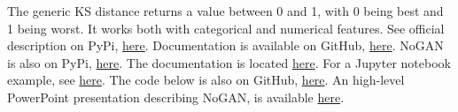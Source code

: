 \documentclass[oneside,10pt]{book}
\begin{document}
The generic KS distance returns a value between 0 and 1, with 0 being best and 1 being worst. It works both with categorical and numerical features.
See official description on PyPi, \href{https://pypi.org/project/genai-evaluation/}{here}. 
 Documentation is available on GitHub, \href{https://rajiviyer.github.io/genai_evaluation/api_reference/}{here}.  NoGAN is 
 also on PyPi, \href{https://pypi.org/project/nogan-synthesizer/}{here}. The documentation is located \href{https://rajiviyer.github.io/nogan_synthesizer/api_reference/}{here}. For a Jupyter notebook example, see \href{https://github.com/VincentGranville/Notebooks/blob/main/NoGAN_library_students.ipynb}{here}. The code below is also on GitHub, \href{https://github.com/VincentGranville/Main/blob/main/NoGAN_library_sudents.py}{here}. An high-level PowerPoint presentation describing NoGAN, is available \href{https://mltblog.com/453YS2N}{here}.\vspace{1ex}

\end{document}
